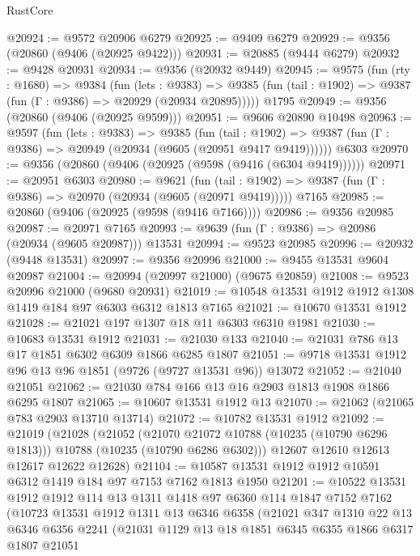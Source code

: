 \begin{lexlean}{RustCore}
\begin{coremodule}
@20924 := @9572 @20906 @6279
@20925 := @9409 @6279
@20929 := @9356 (@20860 (@9406 (@20925 @9422)))
@20931 := @20885 (@9444 @6279)
@20932 := @9428 @20931
@20934 := @9356 (@20932 @9449)
@20945 := @9575
    (fun (rty : @1680) =>
    @9384
      (fun (lets : @9383) =>
      @9385 (fun (tail : @1902) => @9387 (fun (Γ : @9386) => @20929 (@20934 @20895)))))
    @1795
@20949 := @9356 (@20860 (@9406 (@20925 @9599)))
@20951 := @9606 @20890 @10498
@20963 := @9597
    (fun (lets : @9383) =>
    @9385
      (fun (tail : @1902) =>
      @9387 (fun (Γ : @9386) => @20949 (@20934 (@9605 (@20951 @9417 @9419))))))
    @6303
@20970 := @9356 (@20860 (@9406 (@20925 (@9598 (@9416 (@6304 @9419))))))
@20971 := @20951 @6303
@20980 := @9621
    (fun (tail : @1902) => @9387 (fun (Γ : @9386) => @20970 (@20934 (@9605 (@20971 @9419)))))
    @7165
@20985 := @20860 (@9406 (@20925 (@9598 (@9416 @7166))))
@20986 := @9356 @20985
@20987 := @20971 @7165
@20993 := @9639 (fun (Γ : @9386) => @20986 (@20934 (@9605 @20987))) @13531
@20994 := @9523 @20985
@20996 := @20932 (@9448 @13531)
@20997 := @9356 @20996
@21000 := @9455 @13531 @9604 @20987
@21004 := @20994 (@20997 @21000) (@9675 @20859)
@21008 := @9523 @20996 @21000 (@9680 @20931)
@21019 := @10548 @13531 @1912 @1912 @1308 @1419 @184 @97 @6303 @6312 @1813 @7165
@21021 := @10670 @13531 @1912
@21028 := @21021 @197 @1307 @18 @11 @6303 @6310 @1981
@21030 := @10683 @13531 @1912
@21031 := @21030 @133
@21040 := @21031 @786 @13 @17 @1851 @6302 @6309 @1866 @6285 @1807
@21051 := @9718 @13531 @1912 @96 @13 @96 @1851 (@9726 (@9727 @13531 @96)) @13072
@21052 := @21040 @21051
@21062 := @21030 @784 @166 @13 @16 @2903 @1813 @1908 @1866 @6295 @1807
@21065 := @10607 @13531 @1912 @13
@21070 := @21062 (@21065 @783 @2903 @13710 @13714)
@21072 := @10782 @13531 @1912
@21092 := @21019
    (@21028
      (@21052
        (@21070 @21072 @10788 (@10235 (@10790 @6296 @1813)))
        @10788
        (@10235 (@10790 @6286 @6302)))
      @12607
      @12610
      @12613
      @12617
      @12622
      @12628)
@21104 := @10587 @13531 @1912 @1912 @10591 @6312 @1419 @184 @97 @7153 @7162 @1813 @1950
@21201 := @10522
    @13531
    @1912
    @1912
    @114
    @13
    @1311
    @1418
    @97
    @6360
    @114
    @1847
    @7152
    @7162
    (@10723
      @13531
      @1912
      @1311
      @13
      @6346
      @6358
      (@21021
        @347
        @1310
        @22
        @13
        @6346
        @6356
        @2241
        (@21031
          @1129
          @13
          @18
          @1851
          @6345
          @6355
          @1866
          @6317
          @1807
          @21051

\end{coremodule}
\end{lexlean}

